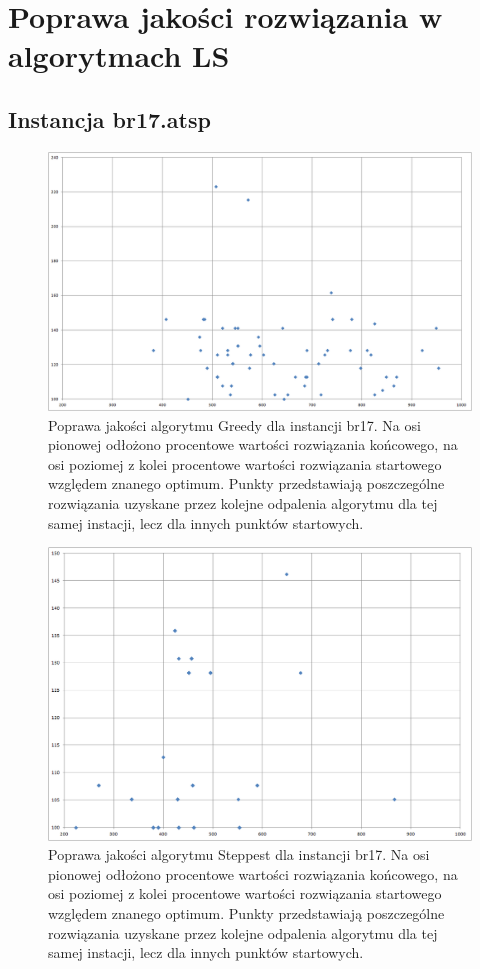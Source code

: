 \section{Poprawa jakości rozwiązania w algorytmach LS}
\subsection{Instancja br17.atsp}
\begin{figure}[!h]
\centering\includegraphics[width=12cm]{img/br17_b2e_g.png}
\caption{Poprawa jakości algorytmu Greedy dla instancji br17. Na osi pionowej odłożono procentowe wartości rozwiązania końcowego, na osi poziomej z kolei procentowe wartości rozwiązania startowego względem znanego optimum. Punkty przedstawiają poszczególne rozwiązania uzyskane przez kolejne odpalenia algorytmu dla tej samej instacji, lecz dla innych punktów startowych.}\label{rys:br17g}
\end{figure}
\begin{figure}[!h]
\centering\includegraphics[width=12cm]{img/br17_b2e_s.png}
\caption{Poprawa jakości algorytmu Steppest dla instancji br17. Na osi pionowej odłożono procentowe wartości rozwiązania końcowego, na osi poziomej z kolei procentowe wartości rozwiązania startowego względem znanego optimum. Punkty przedstawiają poszczególne rozwiązania uzyskane przez kolejne odpalenia algorytmu dla tej samej instacji, lecz dla innych punktów startowych.}\label{rys:br17s}
\end{figure}

